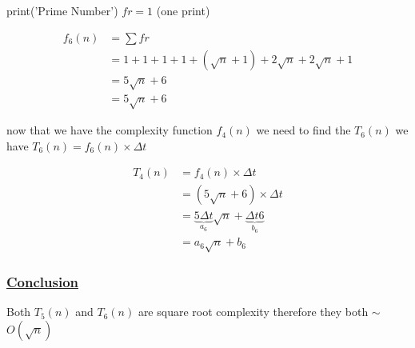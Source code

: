 \vspace{0.15cm}

\textcolor{purplePlot!80!black}{print}(\textcolor{blueArea!60!black}{'Prime Number'}) \hspace{1.95cm} \(fr = 1\) (one print)

\vspace{0.75cm}

\begin{align*}
f_6(n) &= \sum fr \\
       &= 1 + 1 + 1 + 1 + (\sqrt{n}+1) + 2\sqrt{n} + 2\sqrt{n} + 1 \\
       &= 5\sqrt{n} + 6 \\
       &= \boxed{5\sqrt{n} + 6}
\end{align*}

\vspace{0.5cm} 
now that we have the complexity function \(f_4(n)\) we need to find the \(T_6(n)\)  we have \(T_6(n) = f_6(n) \times \Delta t\)

\begin{align*}
T_4(n) &= f_4(n) \times \Delta t\\ 
       &= (5\sqrt{n} + 6) \times \Delta t \\
       &= \underbrace{5 \Delta t}_{a_6} \sqrt{n} + \underbrace{\Delta t 6}_{b_6} \\
&= \boxed{a_6\sqrt{n}+b_6} 
\end{align*}

\subsubsection*{\underline{Conclusion}}
Both \(T_5(n)\) and \(T_6(n)\) are square root complexity therefore they both $\sim$ \(O(\sqrt{n})\)



